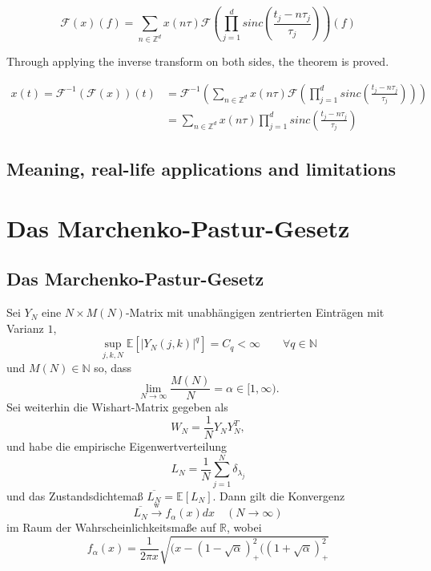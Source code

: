 \documentclass[a4paper, 11pt]{scrreprt}
\newcommand{\RR}{\mathbb{R}}
\newcommand{\EE}{\mathbb{E}}
\newcommand{\ZZ}{\mathbb{Z}}
\newcommand{\NN}{\mathbb{N}}
\newcommand{\FF}{\mathcal{F}}
\begin{document}
\[\FF(x)(f) = \sum_{n \in \ZZ^d} x(n\tau) \FF\left(\prod_{j=1}^d sinc \left( \frac{t_j - n \tau_j}{\tau_j} \right) \right)(f)\]

Through applying the inverse transform on both sides, the theorem is proved.

\begin{align*}
x(t) = \FF^{-1}(\FF(x))(t) &= \FF^{-1} \left( \sum_{n \in \ZZ^d} x(n \tau) \FF \left( \prod_{j=1}^d sinc \left( \frac{t_j - n \tau_j}{\tau_j} \right) \right) \right) \\
&= \sum_{n \in \ZZ^d} x(n\tau) \prod_{j=1}^d sinc \left( \frac{t_j - n \tau_j}{\tau_j} \right)
\end{align*}

\section{Meaning, real-life applications and limitations}

\chapter{Das Marchenko-Pastur-Gesetz}

\section{Das Marchenko-Pastur-Gesetz}

Sei \(Y_N\) eine \(N\times M(N)\)-Matrix mit unabhängigen zentrierten Einträgen mit Varianz \(1\),
	\[\sup_{j,k,N} \EE\left[ | Y_N(j,k)|^q\right] = C_q < \infty \qquad \forall q \in \NN\]
und \(M(N) \in \NN\) so, dass
	\[\lim_{N\to\infty} \frac{M(N)}{N} = \alpha \in[1,\infty). \]
Sei weiterhin die Wishart-Matrix gegeben als 
	\[W_N = \frac{1}{N}Y_NY_N^T,\]
und habe die empirische Eigenwertverteilung
	\[L_N = \frac{1}{N} \sum_{j=1}^{N} \delta_{\lambda_j} \]
und das Zustandsdichtemaß \(\overline{L_N} = \EE[L_N]\). Dann gilt die Konvergenz
	\[\overline{L_N} \xrightarrow{\text{w}} f_{\alpha}(x)dx \quad(N\to\infty)\]
im Raum der Wahrscheinlichkeitsmaße auf \(\RR\), wobei
	\[f_{\alpha}(x)=\frac{1}{2\pi x}\sqrt{(x-(1-\sqrt{\alpha})^2_{+}((1+\sqrt{\alpha})^2_{+}} \]

\newpage
\end{document}
